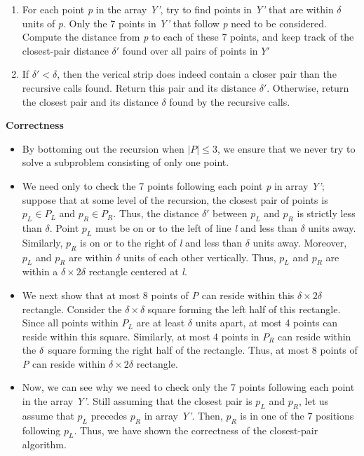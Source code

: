 \documentclass{report}
\begin{document}
\begin{itemize}
\begin{itemize}
\begin{enumerate}
            \item For each point \textit{p} in the array \textit{Y'}, try to find points in \textit{Y'} that are within $\delta$ units of \textit{p}. Only the 7 points in \textit{Y'} that follow \textit{p} need to be considered. Compute the distance from \textit{p} to each of these 7 points, and keep track of the closest-pair distance $\delta'$ found over all pairs of points in $Y'$
            \item If $\delta' < \delta$, then the verical strip does indeed contain a closer pair than the recursive calls found. Return this pair and its distance $\delta'$. Otherwise, return the closest pair and its distance $\delta$ found by the recursive calls.
        \end{enumerate} 
    \end{itemize}
\end{itemize}
\textbf{Correctness}
\begin{itemize}
    \item By bottoming out the recursion when $|P| \leq 3$, we ensure that we never try to solve a subproblem consisting of only one point. 
    \item We need only to check the 7 points following each point \textit{p} in array \textit{Y'}; suppose that at some level of the recursion, the closest pair of points is $p_L \in P_L$ and $p_R \in P_R$. Thus, the distance $\delta'$ between $p_L$ and $p_R$ is strictly less than $\delta$. Point $p_L$ must be on or to the left of line \textit{l} and less than $\delta$ units away. Similarly, $p_R$ is on or to the right of \textit{l} and less than $\delta$ units away. Moreover, $p_L$ and $p_R$ are within $\delta$ units of each other vertically. Thus, $p_L$ and $p_R$ are within a $\delta \times 2\delta$ rectangle centered at \textit{l}.
    \item We next show that at most 8 points of \textit{P} can reside within this $\delta \times 2\delta$ rectangle. Consider the $\delta \times \delta$ square forming the left half of this rectangle. Since all points within $P_L$ are at least $\delta$ units apart, at most 4 points can reside within this square. Similarly, at most 4 points in $P_R$ can reside within the $\delta \time \delta$ square forming the right half of the rectangle. Thus, at most 8 points of \textit{P} can reside within $\delta \times 2 \delta$ rectangle.
    \item Now, we can see why we need to check only the 7 points following each point in the array \textit{Y'}. Still assuming that the closest pair is $p_L$ and $p_R$, let us assume that $p_L$ precedes $p_R$ in array \textit{Y'}. Then, $p_R$ is in one of the 7 positions following $p_L$. Thus, we have shown the correctness of the closest-pair algorithm.
\end{itemize}
\end{document}
